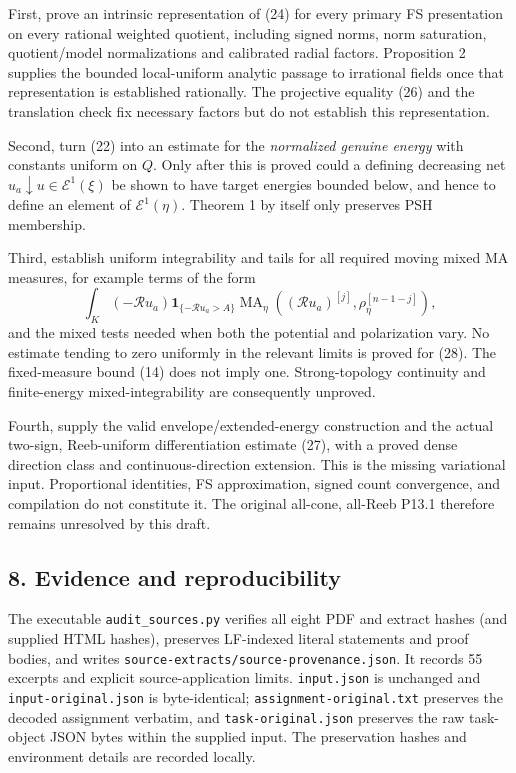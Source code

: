 \documentclass[
  11pt,
]{article}
\begin{document}
First, prove an intrinsic representation of (24) for every primary FS
presentation on every rational weighted quotient, including signed
norms, norm saturation, quotient/model normalizations and calibrated
radial factors. Proposition 2 supplies the bounded local-uniform
analytic passage to irrational fields once that representation is
established rationally. The projective equality (26) and the translation
check fix necessary factors but do not establish this representation.

Second, turn (22) into an estimate for the \emph{normalized genuine
energy} with constants uniform on \(Q\). Only after this is proved could
a defining decreasing net \(u_a\downarrow u\in\mathcal E^1(\xi)\) be
shown to have target energies bounded below, and hence to define an
element of \(\mathcal E^1(\eta)\). Theorem 1 by itself only preserves
PSH membership.

Third, establish uniform integrability and tails for all required moving
mixed MA measures, for example terms of the form \[
 \int_K(-\mathcal R u_a)\mathbf1_{\{-\mathcal R u_a>A\}}
 \operatorname{MA}_\eta((\mathcal R u_a)^{[j]},
                                     \rho_\eta^{[n-1-j]}),
 \tag{28}
\] and the mixed tests needed when both the potential and polarization
vary. No estimate tending to zero uniformly in the relevant limits is
proved for (28). The fixed-measure bound (14) does not imply one.
Strong-topology continuity and finite-energy mixed-integrability are
consequently unproved.

Fourth, supply the valid envelope/extended-energy construction and the
actual two-sign, Reeb-uniform differentiation estimate (27), with a
proved dense direction class and continuous-direction extension. This is
the missing variational input. Proportional identities, FS
approximation, signed count convergence, and compilation do not
constitute it. The original all-cone, all-Reeb P13.1 therefore remains
unresolved by this draft.

\subsection{8. Evidence and
reproducibility}\label{evidence-and-reproducibility}

The executable \texttt{audit\_sources.py} verifies all eight PDF and
extract hashes (and supplied HTML hashes), preserves LF-indexed literal
statements and proof bodies, and writes
\texttt{source-extracts/source-provenance.json}. It records 55 excerpts
and explicit source-application limits. \texttt{input.json} is unchanged
and \texttt{input-original.json} is byte-identical;
\texttt{assignment-original.txt} preserves the decoded assignment
verbatim, and \texttt{task-original.json} preserves the raw task-object
JSON bytes within the supplied input. The preservation hashes and
environment details are recorded locally.
\end{document}
